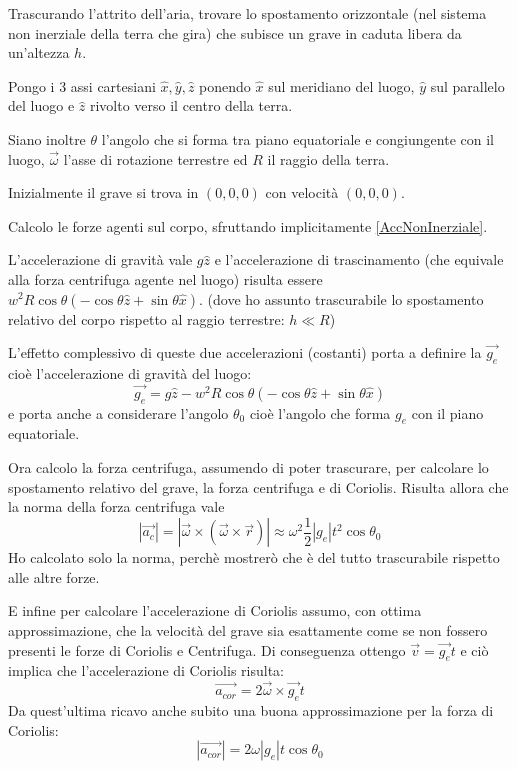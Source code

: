 \documentclass[../main.tex]{subfiles}
\begin{document}

\textex
Trascurando l'attrito dell'aria, trovare lo spostamento orizzontale (nel sistema non inerziale della terra che gira) che subisce un
grave in caduta libera da un'altezza $h$.


\solution
Pongo i 3 assi cartesiani $\hat{x}, \hat{y}, \hat{z}$ ponendo $\hat{x}$ sul meridiano del luogo, $\hat{y}$ sul parallelo del luogo
e $\hat{z}$ rivolto verso il centro della terra.

Siano inoltre $\theta$ l'angolo che si forma tra piano equatoriale e congiungente con il luogo, $\vec{\omega}$
l'asse di rotazione terrestre ed $R$ il raggio della terra.

Inizialmente il grave si trova in $(0,0,0)$ con velocità $(0,0,0)$.

Calcolo le forze agenti sul corpo, sfruttando implicitamente \cref{AccNonInerziale}.

L'accelerazione di gravità vale $g\hat{z}$ e l'accelerazione di trascinamento (che equivale
alla forza centrifuga agente nel luogo) risulta essere 
$w^2R\cos\theta\left(-\cos\theta\hat{z}+\sin\theta\hat{x}\right)$. (dove ho assunto trascurabile lo spostamento relativo del corpo
rispetto al raggio terrestre: $h\ll R$)

L'effetto complessivo di queste due accelerazioni (costanti) porta a definire la $\vec{g_e}$ cioè l'accelerazione di gravità
del luogo:
\begin{equation}\label{cgt:geff}
	\vec{g_e}=g\hat{z}-w^2R\cos\theta\left(-\cos\theta\hat{z}+\sin\theta\hat{x}\right)
\end{equation}
e porta anche a considerare l'angolo $\theta_0$ cioè l'angolo che forma $g_e$ con il piano equatoriale.

Ora calcolo la forza centrifuga, assumendo di poter trascurare, per calcolare lo spostamento relativo del grave,
la forza centrifuga e di Coriolis. Risulta allora che la norma della forza centrifuga vale
\begin{equation}\label{cgt:centrifuga}
	|\vec{a_c}|=|\vec{\omega}\times(\vec{\omega}\times \vec r) | \approx \omega^2\frac 12|g_e|t^2\cos \theta_0
\end{equation}
Ho calcolato solo la norma, perchè mostrerò che è del tutto trascurabile rispetto alle altre forze.

E infine per calcolare l'accelerazione di Coriolis assumo, con ottima approssimazione, che la velocità 
del grave sia esattamente come se non fossero presenti le forze di Coriolis e Centrifuga. Di conseguenza ottengo
$\vec{v}=\vec{g_e}t$ e ciò implica che l'accelerazione di Coriolis risulta:
\begin{equation}\label{cgt:Coriolis}
	\vec {a_{cor}}=2\vec \omega \times \vec{g_e} t
\end{equation}
Da quest'ultima ricavo anche subito una buona approssimazione per la forza di Coriolis:
\begin{equation}\label{cgt:CoriolisApprox}
	|\vec {a_{cor}}| =2\omega|g_e| t\cos \theta_0 
\end{equation}
\end{document}
